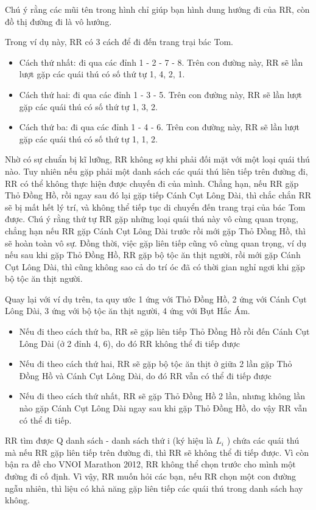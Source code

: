 Chú ý rằng các mũi tên trong hình chỉ giúp bạn hình dung hướng đi của RR, còn đồ thị đường đi là vô hướng.

Trong ví dụ này, RR có 3 cách để đi đến trang trại bác Tom.
\begin{itemize}
	\item Cách thứ nhất: đi qua các đỉnh 1 - 2 - 7 - 8. Trên con đường này, RR sẽ lần lượt gặp các quái thú có số thứ tự 1, 4, 2, 1.
	\item Cách thứ hai: đi qua các đỉnh 1 - 3 - 5. Trên con đường này, RR sẽ lần lượt gặp các quái thú có số thứ tự 1, 3, 2.
	\item Cách thứ ba: đi qua các đỉnh 1 - 4 - 6. Trên con đường này, RR sẽ lần lượt gặp các quái thú có số thứ tự 1, 1, 2.
\end{itemize}

Nhờ có sự chuẩn bị kĩ lưỡng, RR không sợ khi phải đối mặt với một loại quái thú nào. Tuy nhiên nếu gặp phải một danh sách các quái thú liên tiếp trên đường đi, RR có thể không thực hiện được chuyến đi của mình. Chẳng hạn, nếu RR gặp Thỏ Đồng Hồ, rồi ngay sau đó lại gặp tiếp Cánh Cụt Lông Dài, thì chắc chắn RR sẽ bị mất hết lý trí, và không thể tiếp tục di chuyển đến trang trại của bác Tom được. Chú ý rằng thứ tự RR gặp những loại quái thú này vô cùng quan trọng, chẳng hạn nếu RR gặp Cánh Cụt Lông Dài trước rồi mới gặp Thỏ Đồng Hồ, thì sẽ hoàn toàn vô sự. Đồng thời, việc gặp liên tiếp cũng vô cùng quan trọng, ví dụ nếu sau khi gặp Thỏ Đồng Hồ, RR gặp bộ tộc ăn thịt người, rồi mới gặp Cánh Cụt Lông Dài, thì cũng không sao cả do trí óc đã có thời gian nghỉ ngơi khi gặp bộ tộc ăn thịt người.

Quay lại với ví dụ trên, ta quy ước 1 ứng với Thỏ Đồng Hồ, 2 ứng với Cánh Cụt Lông Dài, 3 ứng với bộ tộc ăn thịt người, 4 ứng với Bụt Hắc Ám.
\begin{itemize}
	\item Nếu đi theo cách thứ ba, RR sẽ gặp liên tiếp Thỏ Đồng Hồ rồi đến Cánh Cụt Lông Dài (ở 2 đỉnh 4, 6), do đó RR không thể đi tiếp được
	\item Nếu đi theo cách thứ hai, RR sẽ gặp bộ tộc ăn thịt ở giữa 2 lần gặp Thỏ Đồng Hồ và Cánh Cụt Lông Dài, do đó RR vẫn có thể đi tiếp được
	\item Nếu đi theo cách thứ nhất, RR sẽ gặp Thỏ Đồng Hồ 2 lần, nhưng không lần nào gặp Cánh Cụt Lông Dài ngay sau khi gặp Thỏ Đồng Hồ, do vậy RR vẫn có thể đi tiếp.
\end{itemize}

RR tìm được Q danh sách - danh sách thứ i (ký hiệu là $L_{i}$ ) chứa các quái thú mà nếu RR gặp liên tiếp trên đường đi, thì RR sẽ không thể đi tiếp được. Vì còn bận ra đề cho VNOI Marathon 2012, RR không thể chọn trước cho mình một đường đi cố định. Vì vậy, RR muốn hỏi các bạn, nếu RR chọn một con đường ngẫu nhiên, thì liệu có khả năng gặp liên tiếp các quái thú trong danh sách hay không.